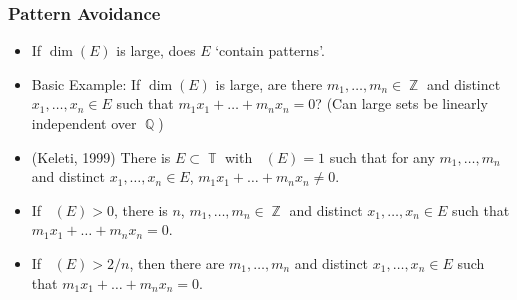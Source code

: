 \documentclass[handout,usenames,dvipsnames]{beamer}
\DeclareMathOperator{\QQ}{\mathbb{Q}}
\DeclareMathOperator{\ZZ}{\mathbb{Z}}
\DeclareMathOperator{\TT}{\mathbb{T}}
\DeclareMathOperator{\fordim}{\text{dim}_{\mathbb{F}}}
\DeclareMathOperator{\hausdim}{\text{dim}_{\mathbb{H}}}
\begin{document}
\begin{frame}
    \frametitle{Pattern Avoidance}

    \begin{itemize}
        \item If $\dim(E)$ is large, does $E$ `contain patterns'.

        \pause
        \item Basic Example: If $\dim(E)$ is large, are there $m_1,\dots,m_n \in \ZZ$ and distinct $x_1,\dots,x_n \in E$ such that $m_1x_1 + \dots + m_nx_n = 0$? (Can large sets be linearly independent over $\QQ$)

        \pause
        \item (Keleti, 1999) There is $E \subset \TT$ with $\hausdim(E) = 1$ such that for any $m_1,\dots,m_n$ and distinct $x_1,\dots,x_n \in E$, $m_1x_1 + \dots + m_nx_n \neq 0$.

        \pause
        \item If $\fordim(E) > 0$, there is $n$, $m_1,\dots,m_n \in \ZZ$ and distinct $x_1,\dots,x_n \in E$ such that $m_1x_1 + \dots + m_nx_n = 0$.

            
            
            
            

        \pause
        \item If $\fordim(E) > 2/n$, then there are $m_1,\dots,m_n$ and distinct $x_1,\dots,x_n \in E$ such that $m_1x_1 + \dots + m_nx_n = 0$.
    \end{itemize}
\end{frame}
\end{document}
